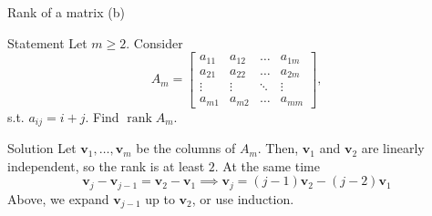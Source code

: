 \documentclass[10pt]{beamer}
\begin{document}
\begin{frame}{Rank of a matrix (b)}
\begin{block}{Statement}
    Let $m \geq 2$. Consider
    $$
    A_m = \begin{bmatrix}
        a_{11} & a_{12} & \dots & a_{1m} \\
        a_{21} & a_{22} & \dots & a_{2m} \\
        \vdots & \vdots & \ddots & \vdots \\
        a_{m1} & a_{m2} & \dots & a_{mm}
    \end{bmatrix},
    $$
    s.t. $a_{ij} = i+j$. Find $\operatorname{rank} A_m$.
\end{block}
\end{frame}

\begin{frame}{Solution}
    Let $\mathbf v_1, \dots, \mathbf v_m$ be the columns of $A_m$. Then, $\mathbf v_1$ and $\mathbf v_2$ are linearly independent, so the rank is at least $2$. At the same time
    $$\mathbf v_j - \mathbf v_{j-1} = \mathbf v_2 - \mathbf v_1 \implies \mathbf v_j = (j-1) \mathbf v_2 - (j-2) \mathbf v_1$$
    Above, we expand $\mathbf v_{j-1}$ up to $\mathbf v_2$, or use induction.
\end{frame}
\end{document}
